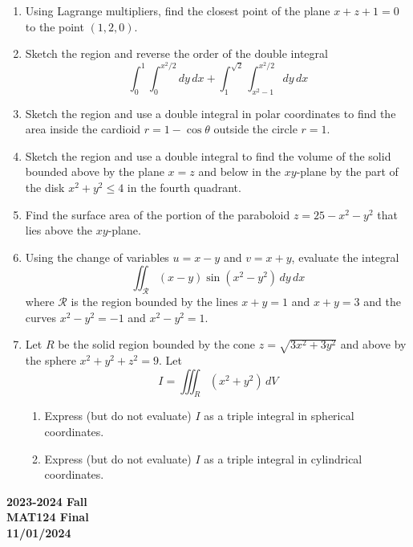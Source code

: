 \documentclass[a4paper, 12pt]{article}
\begin{document}
\begin{enumerate}[leftmargin=*,label=\textbf{\arabic*.}]
\item Using Lagrange multipliers, find the closest point of the plane $x+z+1=0$ to the point $(1,2,0)$.

\item Sketch the region and reverse the order of the double integral
\[\int_0^1\int_0^{x^2/2}dy\,dx+\int_1^{\sqrt2}\int_{x^2-1}^{x^2/2}dy\,dx\]

\item Sketch the region and use a double integral in polar coordinates to find the area inside the cardioid $r=1-\cos\theta$ outside the circle $r=1$.

\item Sketch the region and use a double integral to find the volume of the solid bounded above by the plane $x=z$ and below in the $xy$-plane by the part of the disk $x^2+y^2\leq4$ in the fourth quadrant.

\item Find the surface area of the portion of the paraboloid $z=25-x^2-y^2$ that lies above the $xy$-plane.

\item Using the change of variables $u=x-y$ and $v=x+y$, evaluate the integral
\[\iint_{\mathcal{R}}(x-y)\sin\left(x^2-y^2\right)\,dy\,dx\]
where $\mathcal{R}$ is the region bounded by the lines $x+y=1$ and $x+y=3$ and the curves $x^2-y^2=-1$ and $x^2-y^2=1$.

\item Let $R$ be the solid region bounded by the cone $z=\sqrt{3x^2+3y^2}$ and above by the sphere $x^2+y^2+z^2=9$. Let
\[{I}=\iiint_R\left(x^2+y^2\right)\,dV\]

\begin{enumerate}[leftmargin=*,label=\textbf{\alph*.}]
\item Express (but do not evaluate) ${I}$ as a triple integral in spherical coordinates.
\item Express (but do not evaluate) ${I}$ as a triple integral in cylindrical coordinates.
\end{enumerate}
\end{enumerate}
\newpage
{}
{}
\begin{center}
\textbf{2023-2024 Fall \\MAT124 Final\\11/01/2024}
\end{center}
\end{document}
